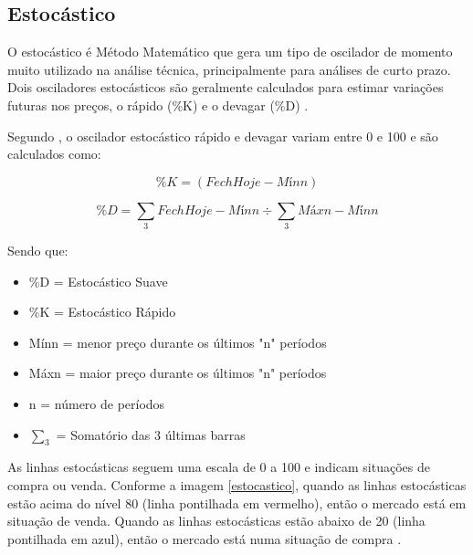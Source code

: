 \subsection{Estocástico}
O estocástico é Método Matemático que gera um tipo de oscilador de momento muito utilizado na análise técnica, principalmente para análises de curto prazo. Dois osciladores estocásticos são geralmente calculados para estimar variações futuras nos preços, o rápido (\%K) e o devagar (\%D) \cite{advfn}.

Segundo , o oscilador estocástico rápido e devagar variam entre 0 e 100 e são calculados como:

\begin{equation}
\%K = (FechHoje - Mínn) %
\end{equation}

\begin{equation}
\%D = \sum_3{FechHoje - Mínn} \div \sum_3{Máxn- Mínn}
\end{equation}

Sendo que:

\begin{itemize}
\item \%D = Estocástico Suave
\item \%K = Estocástico Rápido
\item Mínn = menor preço durante os últimos "n" períodos
\item Máxn = maior preço durante os últimos "n" períodos
\item n = número de períodos
\item $\sum_3$ = Somatório das 3 últimas barras
\end{itemize}

As linhas estocásticas seguem uma escala de 0 a 100 e indicam situações de compra ou venda. Conforme a imagem \ref{estocastico}, quando as linhas estocásticas estão acima do nível 80 (linha pontilhada em vermelho), então o mercado está em situação de venda. Quando as linhas estocásticas estão abaixo de 20 (linha pontilhada em azul), então o mercado está numa situação de compra \cite{investforex}.

